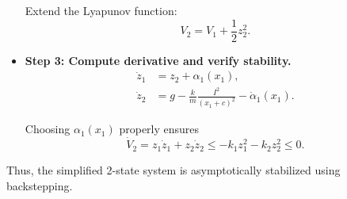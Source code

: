 \begin{example}
\begin{itemize}
    Extend the Lyapunov function:
    \begin{equation}
        V_2 = V_1 + \frac{1}{2} z_2^2.
    \end{equation}

    \item \textbf{Step 3: Compute derivative and verify stability.}  
    \begin{align*}
        \dot{z}_1 &= z_2 + \alpha_1(x_1), \\
        \dot{z}_2 &= g - \frac{k}{m}\frac{I^2}{(x_1+c)^2} - \dot{\alpha}_1(x_1).
    \end{align*}
    
    Choosing $\alpha_1(x_1)$ properly ensures
    \begin{equation}
        \dot{V}_2 = z_1 \dot{z}_1 + z_2 \dot{z}_2 \leq - k_1 z_1^2 - k_2 z_2^2 \leq 0.
    \end{equation}

\end{itemize}

Thus, the simplified 2-state system is asymptotically stabilized using backstepping.

\end{example}





